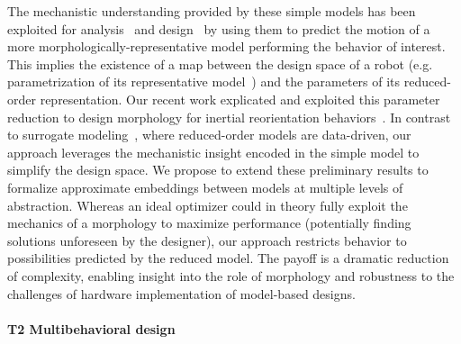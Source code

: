 \documentclass[11pt]{article}
\begin{document}
The mechanistic understanding provided by these simple models has been exploited for analysis~ and design~ by using them to predict the motion of a more morphologically-representative model performing the behavior of interest. 
This implies the existence of a map between the design space of a robot (e.g. parametrization of its representative model~) and the parameters of its reduced-order representation.  Our recent work explicated and exploited this parameter reduction %
to design morphology for inertial reorientation behaviors~. 
In contrast to surrogate modeling~, where reduced-order models are data-driven, our approach leverages the mechanistic insight encoded in the simple model to simplify the design space.
We propose to extend these preliminary results to formalize approximate embeddings between models at multiple levels of abstraction.
Whereas an ideal optimizer could in theory fully exploit the mechanics of a morphology to maximize performance (potentially finding solutions unforeseen by the designer), our approach restricts behavior to possibilities predicted by the reduced model. The payoff is a dramatic reduction of complexity, enabling insight into the role of morphology and robustness to the challenges of hardware implementation of model-based designs.

\paragraph{T2 Multibehavioral design}  
\end{document}
